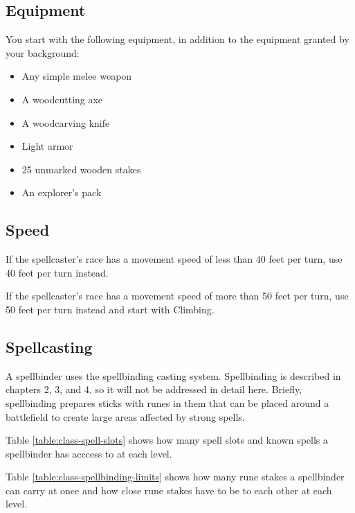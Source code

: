 \subsection{Equipment}
You start with the following equipment, in addition to the equipment granted by your background:

\begin{itemize}
    \item Any simple melee weapon
    \item A woodcutting axe
    \item A woodcarving knife
    \item Light armor
    \item 25 unmarked wooden stakes
    \item An explorer's pack
\end{itemize}

\subsection{Speed}
If the spellcaster's race has a movement speed of less than 40 feet per turn, use 40 feet per turn instead.

If the spellcaster's race has a movement speed of more than 50 feet per turn, use 50 feet per turn instead and start with Climbing.

\subsection{Spellcasting}
A spellbinder uses the spellbinding casting system. Spellbinding is described in chapters 2, 3, and 4, so it will not be addressed in detail here. Briefly, spellbinding prepares sticks with runes in them that can be placed around a battlefield to create large areas affected by strong spells.

Table \ref{table:class-spell-slots} shows how many spell slots and known spells a spellbinder has acccess to at each level.

Table \ref{table:class-spellbinding-limits} shows how many rune stakes a spellbinder can carry at once and how close rune stakes have to be to each other at each level.


